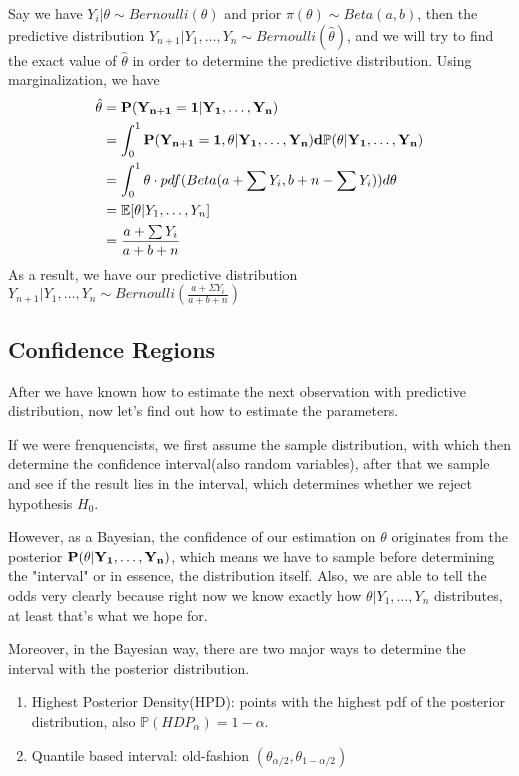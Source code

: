 \begin{example}
    Say we have $Y_i | \theta \sim Bernoulli(\theta)$ and prior $\pi(\theta) \sim Beta(a,b)$, then the predictive distribution $Y_{n+1} | Y_1, \ldots, Y_n \sim Bernoulli(\hat{\theta})$, and we will try to find the exact value of $\hat{\theta}$ in order to determine the predictive distribution. Using marginalization, we have
    \begin{align*}
        \hat{\theta} &= \bf{P}(Y_{n+1} = 1 | Y_1, \ldots, Y_n) \\
        &= \int_0^1 \bf{P}(Y_{n+1}=1, \theta | Y_1, \ldots, Y_n) d \mathbb{P}(\theta | Y_1, \ldots, Y_n) \\
        &= \int_{0}^{1} \theta \cdot pdf(Beta(a + \sum Y_i, b + n - \sum Y_i)) d\theta \\
        &= \mathbb{E}[\theta | Y_1, \ldots, Y_n] \\
        &= \frac{a + \sum Y_i}{a + b + n}
    \end{align*}
    As a result, we have our predictive distribution $Y_{n+1} | Y_1, \ldots, Y_n \sim Bernoulli(\frac{a + \Sigma Y_i}{a + b + n})$
\end{example}


\subsection{Confidence Regions}
After we have known how to estimate the next observation with predictive distribution, now let's find out how to estimate the parameters. 

If we were frenquencists, we first assume the sample distribution, with which then determine the confidence interval(also random variables), after that we sample and see if the result lies in the interval, which determines whether we reject hypothesis $H_0$.

However, as a Bayesian, the confidence of our estimation on $\theta$ originates from the posterior $\bf{P}(\theta | Y_1, \ldots, Y_n)$, which means we have to sample before determining the "interval" or in essence, the distribution itself. Also, we are able to tell the odds very clearly because right now we know exactly how $\theta | Y_1, \ldots, Y_n$ distributes, at least that's what we hope for. 

Moreover, in the Bayesian way, there are two major ways to determine the interval with the posterior distribution. 
\begin{enumerate}
    \item Highest Posterior Density(HPD): points with the highest pdf of the posterior distribution, also $\mathbb{P}(HDP_\alpha) = 1 - \alpha$.
    \item Quantile based interval: old-fashion $(\theta_{\alpha/2}, \theta_{1-\alpha/2})$
\end{enumerate}

